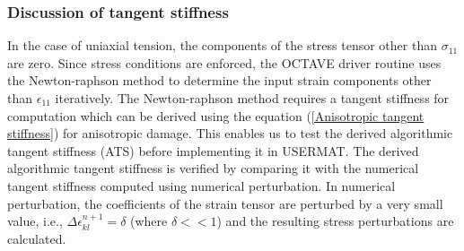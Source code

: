\documentclass[12pt]{report}
\begin{document}
\subsubsection{Discussion of tangent stiffness}
\indent\indent\indent In the case of uniaxial tension, the components of the stress tensor other than $\sigma_{11}$ are zero. Since stress conditions are enforced, the OCTAVE driver routine uses the Newton-raphson method to determine the input strain components other than $\epsilon_{11}$ iteratively. The Newton-raphson method requires a tangent stiffness for computation which can be derived using the equation (\ref{Anisotropic tangent stiffness}) for anisotropic damage. This enables us to test the derived algorithmic tangent stiffness (ATS) before implementing it in USERMAT. The derived algorithmic tangent stiffness is verified by comparing it with the numerical tangent stiffness computed using numerical perturbation. In numerical perturbation, the coefficients of the strain tensor are perturbed by a very small value, i.e.,  $\Delta\epsilon_{kl}^{n+1} = \delta$ (where $\delta<<1$) and the resulting stress perturbations are calculated. 
\end{document}
